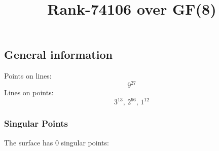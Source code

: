 \documentclass{article}
\newcommand\setTBstruts{\def\T{\rule{0pt}{2.6ex}}%
\def\B{\rule[-1.2ex]{0pt}{0pt}}}
\begin{document}
 
\setTBstruts



{\allowdisplaybreaks%






\title{Rank-74106 over GF(8)}
\author{}%
\maketitle%
%
{}



\subsection*{General information}
Points on lines:
$$
9^{27}$$
Lines on points:
$$
3^{13},\,2^{96},\,1^{12}$$
\subsubsection*{Singular Points}
The surface has 0 singular points:\\
\begin{align*}
\end{align*}
}
\end{document}
